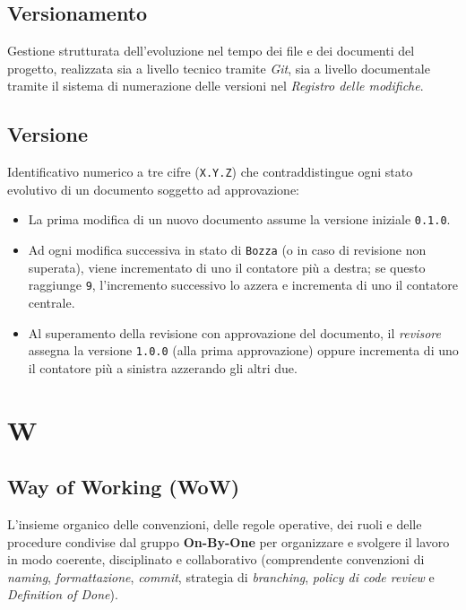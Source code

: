 \documentclass[11pt, a4paper]{article}
\begin{document}
\subsection*{Versionamento}
Gestione strutturata dell'evoluzione nel tempo dei file e dei documenti del progetto, realizzata sia a livello tecnico tramite \textit{Git}, sia a livello documentale tramite il sistema di numerazione delle versioni nel \textit{Registro delle modifiche}.

\subsection*{Versione}
Identificativo numerico a tre cifre (\texttt{X.Y.Z}) che contraddistingue ogni stato evolutivo di un documento soggetto ad approvazione:
\begin{itemize}
    \item La prima modifica di un nuovo documento assume la versione iniziale \texttt{0.1.0}.
    \item Ad ogni modifica successiva in stato di \texttt{Bozza} (o in caso di revisione non superata), viene incrementato di uno il contatore più a destra; se questo raggiunge \texttt{9}, l'incremento successivo lo azzera e incrementa di uno il contatore centrale.
    \item Al superamento della revisione con approvazione del documento, il \textit{revisore} assegna la versione \texttt{1.0.0} (alla prima approvazione) oppure incrementa di uno il contatore più a sinistra azzerando gli altri due.
\end{itemize}

\newpage

\section*{W}

\subsection*{Way of Working (WoW)}
L'insieme organico delle convenzioni, delle regole operative, dei ruoli e delle procedure condivise dal gruppo \textbf{On-By-One} per organizzare e svolgere il lavoro in modo coerente, disciplinato e collaborativo (comprendente convenzioni di \textit{naming}, \textit{formattazione}, \textit{commit}, strategia di \textit{branching}, \textit{policy di code review} e \textit{Definition of Done}).
\end{document}
